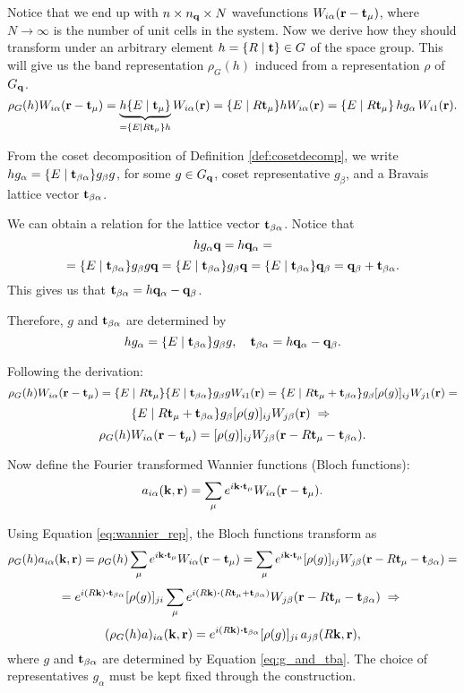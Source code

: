Notice that we end up with $n \times n_{\vb{q}} \times N$ wavefunctions $W_{i\alpha}({\vb{r}}-{\vb{t}}_\mu)$, where $N \to \infty$ is the number of unit cells in the system. Now we derive how they should transform under an arbitrary element $h = \{ R \mid {\vb{t}} \} \in G$ of the space group. This will give us the band representation $\rho_G(h)$ induced from a representation $\rho$ of $G_{\vb{q}}$.
$$
\rho_G(h) W_{i\alpha}({\vb{r}}-{\vb{t}}_\mu) =
\underbrace{h \{ E \mid {\vb{t}}_\mu \}}_{= \{ E \mid R{\vb{t}}_\mu \} h} W_{i\alpha} ({\vb{r}}) =
\{ E \mid R{\vb{t}}_\mu \} h W_{i\alpha} ({\vb{r}}) =
\{ E \mid R{\vb{t}}_\mu \} \, h g_\alpha \, W_{i1} ({\vb{r}}).
$$

From the coset decomposition of Definition \ref{def:cosetdecomp}, we write $h g_\alpha = \{ E \mid {\vb{t}}_{\beta\alpha} \} g_\beta g$, for some $g \in G_{\vb{q}}$, coset representative $g_\beta$, and a Bravais lattice vector ${\vb{t}}_{\beta\alpha}$.

We can obtain a relation for the lattice vector ${\vb{t}}_{\beta\alpha}$. Notice that
$$
h g_\alpha {\vb{q}} = h {\vb{q}}_\alpha =
$$
$$
= \{ E \mid {\vb{t}}_{\beta\alpha} \} g_\beta g {\vb{q}} = \{ E \mid {\vb{t}}_{\beta\alpha} \} g_\beta {\vb{q}} = \{ E \mid {\vb{t}}_{\beta\alpha} \} {\vb{q}}_\beta = {\vb{q}}_\beta + {\vb{t}}_{\beta\alpha}.
$$
This gives us that ${\vb{t}}_{\beta\alpha} = h {\vb{q}}_\alpha - {\vb{q}}_\beta$.

Therefore, $g$ and ${\vb{t}}_{\beta\alpha}$ are determined by
\begin{equation} \label{eq:g_and_tba}
h g_\alpha = \{ E \mid {\vb{t}}_{\beta\alpha} \} g_\beta g, \quad {\vb{t}}_{\beta\alpha} = h {\vb{q}}_\alpha - {\vb{q}}_\beta.
\end{equation}

Following the derivation:
$$
\rho_G(h) W_{i\alpha}({\vb{r}}-{\vb{t}}_\mu) =
\{ E \mid R{\vb{t}}_\mu \} \{ E \mid {\vb{t}}_{\beta\alpha} \} g_\beta g W_{i1}({\vb{r}}) =
\{ E \mid R{\vb{t}}_\mu + {\vb{t}}_{\beta\alpha} \} g_\beta [\rho(g)]_{ij} W_{j1}({\vb{r}}) =
$$
$$
\{ E \mid R{\vb{t}}_\mu + {\vb{t}}_{\beta\alpha} \} g_\beta [\rho(g)]_{ij} W_{j\beta}({\vb{r}}) \; \Rightarrow \;
$$
\begin{equation} \label{eq:wannier_rep}
\rho_G(h) W_{i\alpha}({\vb{r}}-{\vb{t}}_\mu) = [\rho(g)]_{ij} W_{j\beta}({\vb{r}} - R{\vb{t}}_\mu - {\vb{t}}_{\beta\alpha}).
\end{equation}

\n

Now define the Fourier transformed Wannier functions (Bloch functions):
$$
a_{i\alpha}(\k, \r) = \sum_{\mu} e^{i\k\vdot\t_\mu} W_{i\alpha}(\r-\t_\mu).
$$

Using Equation \ref{eq:wannier_rep}, the Bloch functions transform as
$$
\rho_G(h) a_{i\alpha}(\k,\r) =
\rho_G(h) \sum_{\mu} e^{i\k\vdot\t_\mu} W_{i\alpha}(\r-\t_\mu) =
\sum_{\mu} e^{i\k\vdot\t_\mu} [\rho(g)]_{ij} W_{j\beta}(\r-R\t_\mu-\t_{\beta\alpha}) =
$$
$$
= e^{i(R\k)\vdot\t_{\beta\alpha}} [\rho(g)]_{ji} \sum_{\mu} e^{i(R\k)\vdot(R\t_\mu+\t_{\beta\alpha})} W_{j\beta}(\r-R\t_\mu-\t_{\beta\alpha}) \implies
$$
\begin{equation} \label{eq:bloch_rep}
(\rho_G(h) a)_{i\alpha}(\k,\r) = e^{i(R\k)\vdot\t_{\beta\alpha}} [\rho(g)]_{ji} \, a_{j\beta}(R\k, \r),
\end{equation}
where $g$ and ${\vb{t}}_{\beta\alpha}$ are determined by Equation \ref{eq:g_and_tba}. The choice of representatives $g_\alpha$ must be kept fixed through the construction.

